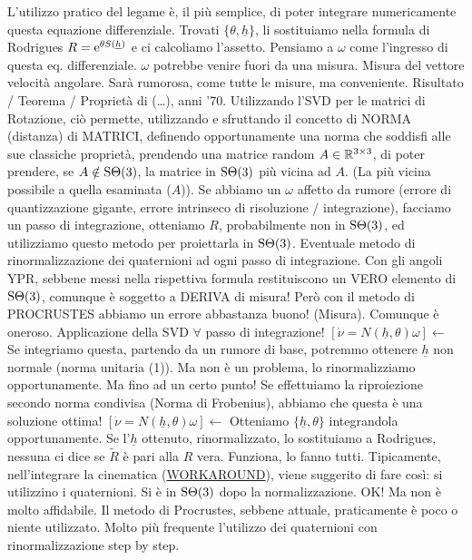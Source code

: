 L'utilizzo pratico del legame è, il più semplice, di poter integrare numericamente questa equazione differenziale. Trovati $\{\theta,\underline{h}\}$, li sostituiamo nella formula di Rodrigues $R=\mathop{}\!\mathrm{e}^{\theta S(\underline{h})}$ e ci calcoliamo l'assetto. Pensiamo a $\omega$ come l'ingresso di questa eq. differenziale. $\omega$ potrebbe venire fuori da una misura. Misura del vettore velocità angolare. Sarà rumorosa, come tutte le misure, ma conveniente. Risultato / Teorema / Proprietà di (\dots), anni '70. Utilizzando l'SVD per le matrici di Rotazione, ciò permette, utilizzando e sfruttando il concetto di NORMA (distanza) di MATRICI, definendo opportunamente una norma che soddisfi alle sue classiche proprietà, prendendo una matrice random $A\in\mathbb{R}^{3\times 3}$, di poter prendere, se $A\notin\operatorname{S\Theta}(3)$, la matrice in $\operatorname{S\Theta}(3)$ più vicina ad $A$. (La più vicina possibile a quella esaminata ($A$)). Se abbiamo un $\omega$ affetto da rumore (errore di quantizzazione gigante, errore intrinseco di risoluzione / integrazione), facciamo un passo di integrazione, otteniamo $R$, probabilmente non in $\operatorname{S\Theta}(3)$, ed utilizziamo questo metodo per proiettarla in $\operatorname{S\Theta}(3)$. Eventuale metodo di rinormalizzazione dei quaternioni ad ogni passo di integrazione. Con gli angoli YPR, sebbene messi nella rispettiva formula restituiscono un VERO elemento di $\operatorname{S\Theta}(3)$, comunque è soggetto a DERIVA di misura! Però con il metodo di PROCRUSTES abbiamo un errore abbastanza buono! (Misura). Comunque è oneroso. Applicazione della SVD $\forall$ passo di integrazione! $[\dot{\nu}=N(\underline{h},\theta)\omega] \leftarrow$ Se integriamo questa, partendo da un rumore di base, potremmo ottenere $\underline{h}$ non normale (norma unitaria (1)). Ma non è un problema, lo rinormalizziamo opportunamente. Ma fino ad un certo punto! Se effettuiamo la riproiezione secondo norma condivisa (Norma di Frobenius), abbiamo che questa è una soluzione ottima! $[\dot{\nu}=N(\underline{h},\theta)\omega] \leftarrow$ Otteniamo $\{\underline{h},\theta\}$ integrandola opportunamente. Se l'$\underline{h}$ ottenuto, rinormalizzato, lo sostituiamo a Rodrigues, nessuna ci dice se $\tilde{R}$ è pari alla $R$ vera. Funziona, lo fanno tutti. Tipicamente, nell'integrare la cinematica (\underline{WORKAROUND}), viene suggerito di fare così: si utilizzino i quaternioni. Si è in $\operatorname{S\Theta}(3)$ dopo la normalizzazione. OK! Ma non è molto affidabile. Il metodo di Procrustes, sebbene attuale, praticamente è poco o niente utilizzato. Molto più frequente l'utilizzo dei quaternioni con rinormalizzazione step by step. 

